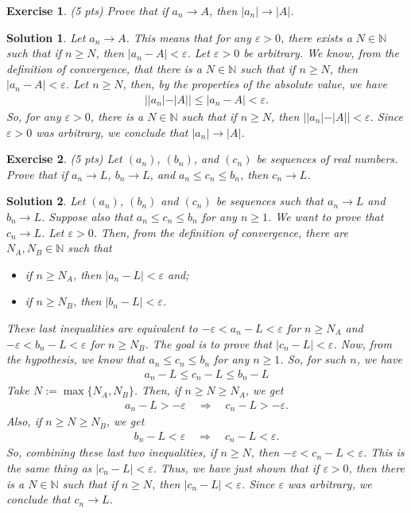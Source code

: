 \documentclass[12pt]{article}
\newcommand{\bN}{\mathbb{N}}
\newcommand{\ra}{\rightarrow}
\newcommand{\Ra}{\Rightarrow}
\theoremstyle{plain}
\newtheorem{exer}{\textbf{Exercise}}}
\theoremstyle{plain}
\newtheorem*{sol}{\textbf{Solution}}}
\theoremstyle{plain}
\theoremstyle{plain}
\begin{document}
\begin{exer}
(5 pts)
Prove that if $a_n \ra A$, then $|a_n| \ra |A|$.
\end{exer}
\begin{sol}
Let $a_n \ra A$. This means that for any $\varepsilon > 0$, there exists a $N \in \bN$ such that if $n \geq N$, then $|a_n - A| < \varepsilon$. Let $\varepsilon > 0$ be arbitrary. We know, from the definition of convergence, that there is a $N \in \bN$ such that if $n \geq N$, then $|a_n - A| < \varepsilon$. Let $n \geq N$, then, by the properties of the absolute value, we have
	\begin{align*}
	| |a_n | - |A|| \leq |a_n - A| < \varepsilon .
	\end{align*}
So, for any $\varepsilon > 0$, there is a $N \in \bN$ such that if $n \geq N$, then $||a_n| - |A|| < \varepsilon$. Since $\varepsilon > 0$ was arbitrary, we conclude that $|a_n| \ra |A|$.
\end{sol}

\begin{exer}
(5 pts)
Let $(a_n)$, $(b_n)$, and $(c_n)$ be sequences of real numbers. Prove that if $a_n \ra L$, $b_n \ra L$, and $a_n \leq c_n \leq b_n$, then $c_n \ra L$.
\end{exer}
\begin{sol}
Let $(a_n)$, $(b_n)$ and $(c_n)$ be sequences such that $a_n \ra L$ and $b_n \ra L$. Suppose also that $a_n \leq c_n \leq b_n$ for any $n \geq 1$. We want to prove that $c_n \ra L$. Let $\varepsilon > 0$. Then, from the definition of convergence, there are $N_A , N_B \in \bN$ such that
	\begin{itemize}
	\item if $n \geq N_A$, then $|a_n - L| < \varepsilon$ and;
	\item if $n \geq N_B$, then $|b_n - L| < \varepsilon$.
	\end{itemize}
These last inequalities are equivalent to $-\varepsilon < a_n - L < \varepsilon$ for $n \geq N_A$ and $-\varepsilon < b_n - L < \varepsilon$ for $n \geq N_B$. The goal is to prove that $|c_n - L| < \varepsilon$. Now, from the hypothesis, we know that $a_n \leq c_n \leq b_n$ for any $n \geq 1$. So, for such $n$, we have
	\begin{align*}
	a_n - L \leq c_n - L \leq b_n - L
	\end{align*}
Take $N := \max \{ N_A , N_B \}$. Then, if $n \geq N \geq N_A$, we get
	\begin{align*}
	a_n - L > -\varepsilon \quad \Ra \quad c_n - L > -\varepsilon .
	\end{align*}
Also, if $n \geq N \geq N_B$, we get
	\begin{align*}
	b_n - L < \varepsilon \quad \Ra \quad c_n - L < \varepsilon .
	\end{align*}
So, combining these last two inequalities, if $n \geq N$, then $-\varepsilon < c_n - L < \varepsilon$. This is the same thing as $|c_n - L| < \varepsilon$. Thus, we have just shown that if $\varepsilon > 0$, then there is a $N \in \bN$ such that if $n \geq N$, then $|c_n - L| < \varepsilon$. Since $\varepsilon$ was arbitrary, we conclude that $c_n \ra L$.
\end{sol}
\end{document}

